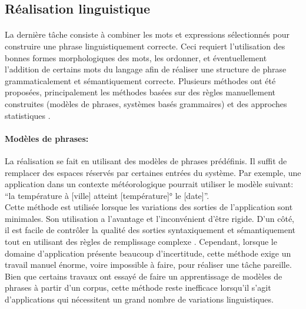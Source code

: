 	\subsection{Réalisation linguistique}
	\paragraph{}
	La dernière tâche consiste à combiner les mots et expressions sélectionnés pour construire une phrase linguistiquement correcte. Ceci requiert l’utilisation des bonnes formes morphologiques des mots, les ordonner, et éventuellement  l’addition de certains mots du langage afin de réaliser une structure de phrase grammaticalement et sémantiquement correcte. Plusieurs méthodes ont été proposées, principalement les méthodes basées sur des règles manuellement construites (modèles de phrases, systèmes basés grammaires) et des approches statistiques \cite{Gatt2018}.
	\paragraph{Modèles de phrases:} La réalisation se fait en utilisant des modèles de phrases prédéfinis. Il suffit de remplacer des espaces réservés par certaines entrées du système. Par exemple, une application dans un contexte météorologique pourrait utiliser le modèle suivant: “la température à [ville] atteint [température]° le [date]”.\\
Cette méthode est utilisée lorsque les variations des sorties de l’application sont minimales. Son utilisation a l’avantage et l’inconvénient d’être rigide. D’un côté, il est facile de contrôler la qualité des sorties syntaxiquement et sémantiquement tout en utilisant des règles de remplissage complexe \cite{Theune2001}. Cependant, lorsque le domaine d’application présente beaucoup d’incertitude, cette méthode exige un travail manuel énorme, voire impossible à faire, pour réaliser une tâche pareille. Bien que certains travaux ont essayé de faire un apprentissage de modèles de phrases à partir d’un corpus\cite{Angeli2012}, cette méthode reste inefficace lorsqu’il s’agit d’applications qui nécessitent un grand nombre de variations linguistiques.
